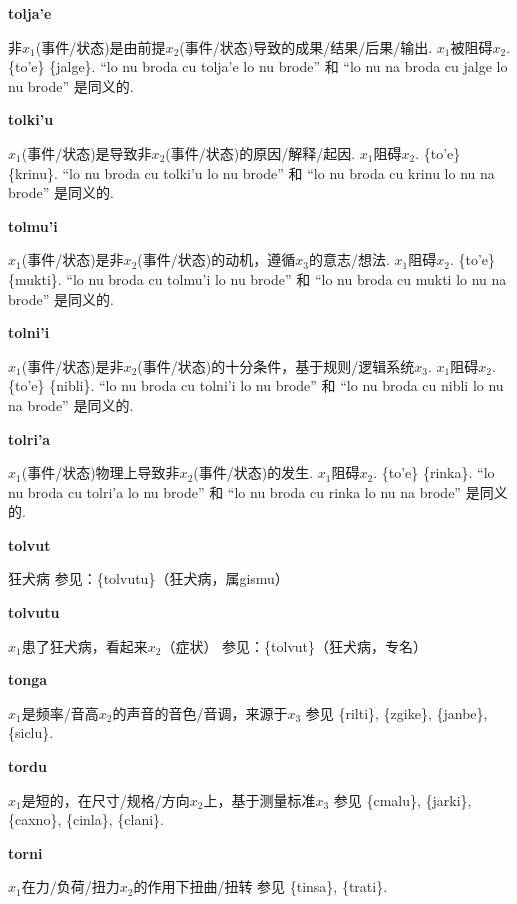 \documentclass[notitlepage,twocolumn,a4paper,10pt]{book}
\begin{document}
{\sffamily\bfseries tolja'e} 非$x_1$(事件\slash{}状态)是由前提$x_2$(事件\slash{}状态)导致的成果\slash{}结果\slash{}后果\slash{}输出. $x_1$被阻碍$x_2$. \textemdash{} \{to'e\} \{jalge\}. ``lo nu broda cu tolja'e lo nu brode'' 和 ``lo nu na broda cu jalge lo nu brode'' 是同义的.

{\sffamily\bfseries tolki'u} $x_1$(事件\slash{}状态)是导致非$x_2$(事件\slash{}状态)的原因\slash{}解释\slash{}起因. $x_1$阻碍$x_2$. \textemdash{} \{to'e\} \{krinu\}. ``lo nu broda cu tolki'u lo nu brode'' 和 ``lo nu broda cu krinu lo nu na brode'' 是同义的.

{\sffamily\bfseries tolmu'i} $x_1$(事件\slash{}状态)是非$x_2$(事件\slash{}状态)的动机，遵循$x_3$的意志\slash{}想法. $x_1$阻碍$x_2$. \textemdash{} \{to'e\} \{mukti\}. ``lo nu broda cu tolmu'i lo nu brode'' 和 ``lo nu broda cu mukti lo nu na brode'' 是同义的.

{\sffamily\bfseries tolni'i} $x_1$(事件\slash{}状态)是非$x_2$(事件\slash{}状态)的十分条件，基于规则\slash{}逻辑系统$x_3$. $x_1$阻碍$x_2$. \textemdash{} \{to'e\} \{nibli\}. ``lo nu broda cu tolni'i lo nu brode'' 和 ``lo nu broda cu nibli lo nu na brode'' 是同义的.

{\sffamily\bfseries tolri'a} $x_1$(事件\slash{}状态)物理上导致非$x_2$(事件\slash{}状态)的发生. $x_1$阻碍$x_2$. \textemdash{} \{to'e\} \{rinka\}. ``lo nu broda cu tolri'a lo nu brode'' 和 ``lo nu broda cu rinka lo nu na brode'' 是同义的.

{\sffamily\bfseries tolvut} 狂犬病 \textemdash{} 参见：\{tolvutu\}（狂犬病，属gismu）

{\sffamily\bfseries tolvutu} $x_1$患了狂犬病，看起来$x_2$（症状） \textemdash{} 参见：\{tolvut\}（狂犬病，专名）

{\sffamily\bfseries tonga}\enspace {\ttfamily\bfseries[tog     to'a]}  $x_1$是频率\slash{}音高$x_2$的声音的音色\slash{}音调，来源于$x_3$ \textemdash{} 参见 \{rilti\}, \{zgike\}, \{janbe\}, \{siclu\}.

{\sffamily\bfseries tordu}\enspace {\ttfamily\bfseries[tor     to'u]}  $x_1$是短的，在尺寸\slash{}规格\slash{}方向$x_2$上，基于测量标准$x_3$ \textemdash{} 参见 \{cmalu\}, \{jarki\}, \{caxno\}, \{cinla\}, \{clani\}.

{\sffamily\bfseries torni}\enspace {\ttfamily\bfseries[ton     to'i]}  $x_1$在力\slash{}负荷\slash{}扭力$x_2$的作用下扭曲\slash{}扭转 \textemdash{} 参见 \{tinsa\}, \{trati\}.
\end{document}
